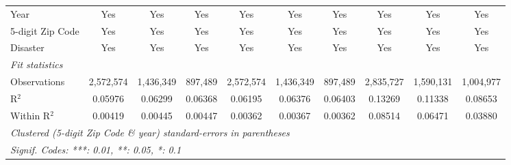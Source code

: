 \begin{tabular}{lccccccccc}
   Year                                                       & Yes            & Yes            & Yes           & Yes            & Yes            & Yes           & Yes          & Yes       & Yes\\  
   5-digit Zip Code                                           & Yes            & Yes            & Yes           & Yes            & Yes            & Yes           & Yes          & Yes       & Yes\\  
   Disaster                                                   & Yes            & Yes            & Yes           & Yes            & Yes            & Yes           & Yes          & Yes       & Yes\\  
   \midrule
   \emph{Fit statistics}\\
   Observations                                               & 2,572,574      & 1,436,349      & 897,489       & 2,572,574      & 1,436,349      & 897,489       & 2,835,727    & 1,590,131 & 1,004,977\\  
   R$^2$                                                      & 0.05976        & 0.06299        & 0.06368       & 0.06195        & 0.06376        & 0.06403       & 0.13269      & 0.11338   & 0.08653\\  
   Within R$^2$                                               & 0.00419        & 0.00445        & 0.00447       & 0.00362        & 0.00367        & 0.00362       & 0.08514      & 0.06471   & 0.03880\\  
   \midrule \midrule
   \multicolumn{10}{l}{\emph{Clustered (5-digit Zip Code \& year) standard-errors in parentheses}}\\
   \multicolumn{10}{l}{\emph{Signif. Codes: ***: 0.01, **: 0.05, *: 0.1}}\\
\end{tabular}
\par\endgroup
